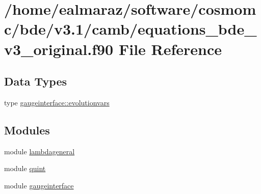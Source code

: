 \hypertarget{equations__bde__v3__original_8f90}{}\section{/home/ealmaraz/software/cosmomc/bde/v3.1/camb/equations\+\_\+bde\+\_\+v3\+\_\+original.f90 File Reference}
\label{equations__bde__v3__original_8f90}
\subsection*{Data Types}
\begin{DoxyCompactItemize}
\item 
type \mbox{\hyperlink{structgaugeinterface_1_1evolutionvars}{gaugeinterface\+::evolutionvars}}
\end{DoxyCompactItemize}
\subsection*{Modules}
\begin{DoxyCompactItemize}
\item 
module \mbox{\hyperlink{namespacelambdageneral}{lambdageneral}}
\item 
module \mbox{\hyperlink{namespacequint}{quint}}
\item 
module \mbox{\hyperlink{namespacegaugeinterface}{gaugeinterface}}
\end{DoxyCompactItemize}
